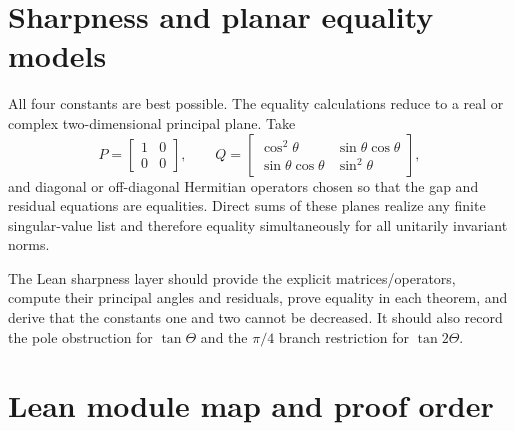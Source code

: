 \documentclass[11pt]{article}
\theoremstyle{remark}
\begin{document}
\section{Sharpness and planar equality models}

All four constants are best possible.  The equality calculations reduce to a
real or complex two-dimensional principal plane.  Take
\[
  P=\begin{bmatrix}1&0\\0&0\end{bmatrix},\qquad
  Q=\begin{bmatrix}\cos^2\theta&\sin\theta\cos\theta\\
                    \sin\theta\cos\theta&\sin^2\theta\end{bmatrix},
\]
and diagonal or off-diagonal Hermitian operators chosen so that the gap and
residual equations are equalities.  Direct sums of these planes realize any
finite singular-value list and therefore equality simultaneously for all
unitarily invariant norms.

The Lean sharpness layer should provide the explicit matrices/operators,
compute their principal angles and residuals, prove equality in each theorem,
and derive that the constants one and two cannot be decreased.  It should also
record the pole obstruction for \(\tan\Theta\) and the \(\pi/4\) branch
restriction for \(\tan2\Theta\).

\section{Lean module map and proof order}
\end{document}

